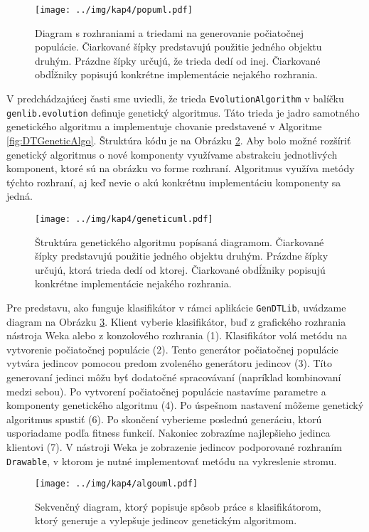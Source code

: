 \begin{figure}[h]
\centering
\centerline{\mbox{\texttt{[image: ../img/kap4/popuml.pdf]}}}
\caption{Diagram s rozhraniami a triedami na generovanie počiatočnej populácie. Čiarkované šípky predstavujú použitie jedného objektu druhým. Prázdne šípky určujú, že trieda dedí od inej. Čiarkované obdĺžniky popisujú konkrétne implementácie nejakého rozhrania.}\label{fig:popuml}
\end{figure}

V predchádzajúcej časti sme uviedli, že trieda \verb|EvolutionAlgorithm| v balíčku \verb|genlib.evolution| definuje genetický algoritmus. Táto trieda je jadro samotného genetického algoritmu a implementuje chovanie predstavené v Algoritme \ref{fig:DTGeneticAlgo}. Štruktúra kódu je na Obrázku \ref{fig:geneticuml}. Aby bolo možné rozšíriť genetický algoritmus o nové komponenty využívame abstrakciu jednotlivých komponent, ktoré sú na obrázku vo forme rozhraní. Algoritmus využíva metódy týchto rozhraní, aj keď nevie o akú konkrétnu implementáciu komponenty sa jedná.

\begin{figure}[h]
\centering
\centerline{\mbox{\texttt{[image: ../img/kap4/geneticuml.pdf]}}}
\caption{Štruktúra genetického algoritmu popísaná diagramom. Čiarkované šípky predstavujú použitie jedného objektu druhým. Prázdne šípky určujú, ktorá trieda dedí od ktorej. Čiarkované obdĺžniky popisujú konkrétne implementácie nejakého rozhrania.}\label{fig:geneticuml}
\end{figure}

Pre predstavu, ako funguje klasifikátor v rámci aplikácie \verb|GenDTLib|, uvádzame 
diagram na Obrázku \ref{fig:clasuml}. Klient vyberie klasifikátor, buď z grafického rozhrania nástroja Weka alebo z konzolového rozhrania (1). Klasifikátor volá metódu na vytvorenie počiatočnej populácie (2). Tento generátor počiatočnej populácie vytvára jedincov pomocou predom zvoleného generátoru jedincov (3). Títo generovaní jedinci môžu byť dodatočné spracovávaní (napríklad kombinovaní medzi sebou). Po vytvorení počiatočnej populácie nastavíme parametre a komponenty genetického algoritmu (4). Po úspešnom nastavení môžeme genetický algoritmus spustiť (6). Po skončení vyberieme poslednú generáciu, ktorú usporiadame podľa fitness funkcií. Nakoniec zobrazíme najlepšieho jedinca klientovi (7). V nástroji Weka je zobrazenie jedincov podporované rozhraním \verb|Drawable|, v ktorom je nutné implementovať metódu na vykreslenie stromu.

\begin{figure}[h]
\centering
\centerline{\mbox{\texttt{[image: ../img/kap4/algouml.pdf]}}}
\caption{Sekvenčný diagram, ktorý popisuje spôsob práce s klasifikátorom, ktorý generuje a vylepšuje jedincov genetickým algoritmom.}\label{fig:clasuml}
\end{figure}
